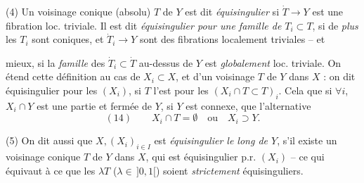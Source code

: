 \documentclass[11pt,a4paper]{article}
\begin{document}

(4)  Un voisinage conique (absolu) $T$ de $Y$ est dit \emph{équisingulier} si $\dot T\to Y$ est une fibration loc. triviale. Il est dit \emph{équisingulier pour une famille de $T_i\subset T$}, si de \emph{plus} les $T_i$ sont coniques, et $\dot T_i\to Y$ sont des fibrations localement triviales -- et \uncertain{\ill{}}



mieux, si la \emph{famille} des $\dot T_i\subset\dot T$ au-dessus de $Y$ est \emph{globalement} loc. triviale. On étend cette définition au cas de $X_i\subset X$, et d'un voisinage   $T$ de $Y$ dans $X$ : on dit  équisingulier pour les $(X_i)$, si $T$ l'est pour les $(X_i\cap T\subset T)_i$. Cela  \struck{\ill{}} que si $\forall i$, $X_i\cap Y$ est une partie  et fermée de $Y$,  si $Y$ est connexe, que   l'alternative
\[
(14)\qquad X_i\cap T=\emptyset\quad\text{ou}\quad X_i\supset Y .
\]

\marginal{on dit \emph{strictement} \ill{} \ldots\ \emph{strict} \ldots\ si $T$ \uncertain{équisingulier} \ldots\ les $\lambda T$ \ldots\ $\lambda\in\,]0,1[$}

(5) On dit aussi que $X,(X_i)_{i\in I}$ est  \emph{équisingulier le long de $Y$}, s'il existe un voisinage conique \struck{\ill{}} $T$ de $Y$ dans $X$, qui est équisingulier p.r. \struck{\ill{}}  $(X_i)$ -- ce qui équivaut à ce que les $\lambda T$ ($\lambda\in\,]0,1[$) soient \emph{strictement} équisinguliers.


\end{document}
